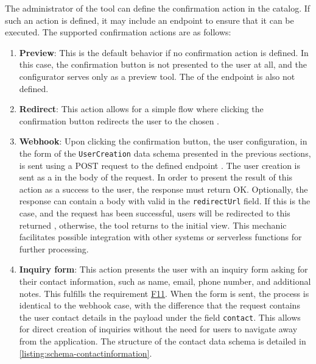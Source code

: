 The administrator of the tool can define the confirmation action in the catalog. If such an action is defined, it may include an endpoint  to ensure that it can be executed. The supported confirmation actions are as follows:

\begin{enumerate}
    \item \textbf{Preview}: This is the default behavior if no confirmation action is defined. In this case, the confirmation button is not presented to the user at all, and the configurator serves only as a preview tool. The  of the endpoint is also not defined.
    \item \textbf{Redirect}: This action allows for a simple flow where clicking the confirmation button redirects the user to the chosen .
    \item \textbf{Webhook}: Upon clicking the confirmation button, the user configuration, in the form of the \texttt{UserCreation} data schema presented in the previous sections, is sent using a POST request to the defined endpoint . The user creation is sent as a  in the body of the request. In order to present the result of this action as a success to the user, the response must return OK. Optionally, the response can contain a  body with valid  in the \texttt{redirectUrl} field. If this is the case, and the request has been successful, users will be redirected to this returned , otherwise, the tool returns to the initial view. This mechanic facilitates possible integration with other systems or serverless functions for further processing.
    \item \textbf{Inquiry form}: This action presents the user with an inquiry form asking for their contact information, such as name, email, phone number, and additional notes. This fulfills the requirement \hyperref[itm:F11]{F11}. When the form is sent, the process is identical to the webhook case, with the difference that the request contains the user contact details in the  payload under the field \texttt{contact}. This allows for direct creation of inquiries without the need for users to navigate away from the application. The structure of the contact data schema is detailed in \autoref{listing:schema-contactinformation}.
\end{enumerate}


